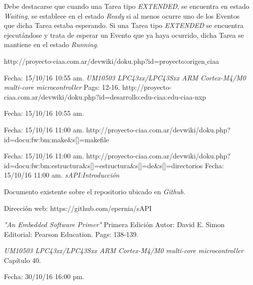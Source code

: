 \documentclass[12pt,letterpaper]{article}
\begin{document}
Debe destacarse que cuando una Tarea tipo \textit{EXTENDED}, se encuentra en estado \textit{Waiting}, se establece en el estado \textit{Ready} si al menos ocurre uno de los Eventos que dicha Tarea estaba esperando. Si una Tarea tipo \textit{EXTENDED} se encuentra ejecutándose y trata de esperar un Evento que ya haya ocurrido, dicha Tarea se mantiene en el estado \textit{Running}.
\begin{thebibliography}{}
 {\footnotesize http://proyecto-ciaa.com.ar/devwiki/doku.php?id=proyecto:origen$\_$ciaa}

Fecha: 15/10/16 10:55 am.
\textit{UM10503
LPC43xx/LPC43Sxx ARM Cortex-M4/M0 multi-core
microcontroller} Pags: 12-16.
 {\footnotesize http://proyecto-ciaa.com.ar/devwiki/doku.php?id=desarrollo:edu-ciaa:edu-ciaa-nxp}

Fecha: 15/10/16 10:55 am.
\

Fecha: 15/10/16 11:00 am.
 {\footnotesize http://proyecto-ciaa.com.ar/devwiki/doku.php?id=docu:fw:bm:make$\&$s[]=makefile}

Fecha: 15/10/16 11:00 am.
 {\footnotesize http://proyecto-ciaa.com.ar/devwiki/doku.php?id=docu:fw:bm:estructura$\&$s[]=estructura$\&$s[]=de$\&$s[]=directorios} Fecha: 15/10/16 11:00 am.
\textit{sAPI:Introducción}

Documento existente sobre el repositorio ubicado en \textit{Github}.

Dirección web: https://github.com/epernia/sAPI

\textit{"An Embedded Software Primer"} Primera Edición Autor: David E. Simon Editorial: Pearson Education. Pags: 138-139.

 \textit{UM10503 LPC43xx/LPC43Sxx ARM Cortex-M4/M0 multi-core microcontroller} Capítulo 40.


Fecha: 30/10/16 16:00 pm.
\end{thebibliography}
\end{document}
